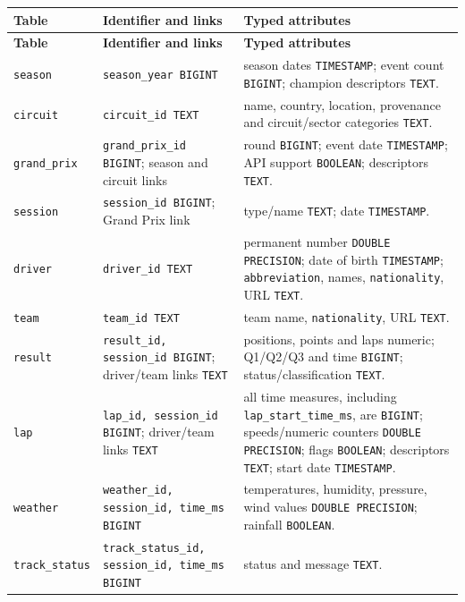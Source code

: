 \documentclass[a4paper,11pt]{article}
\begin{document}
	\begin{longtable}{p{2.5cm}p{4.3cm}p{8.2cm}}
		\toprule
		\textbf{Table} & \textbf{Identifier and links} & \textbf{Typed attributes} \\
		\midrule
		\endfirsthead
		\toprule
		\textbf{Table} & \textbf{Identifier and links} & \textbf{Typed attributes} \\
		\midrule
		\endhead
		\texttt{season} & \texttt{season\_year BIGINT} & season dates \texttt{TIMESTAMP}; event count \texttt{BIGINT}; champion descriptors \texttt{TEXT}. \\
		\midrule
		\texttt{circuit} & \texttt{circuit\_id TEXT} & name, country, location, provenance and circuit/sector categories \texttt{TEXT}. \\
		\midrule
		\texttt{grand\_prix} & \texttt{grand\_prix\_id BIGINT}; season and circuit links & round \texttt{BIGINT}; event date \texttt{TIMESTAMP}; API support \texttt{BOOLEAN}; descriptors \texttt{TEXT}. \\
		\midrule
		\texttt{session} & \texttt{session\_id BIGINT}; Grand Prix link & type/name \texttt{TEXT}; date \texttt{TIMESTAMP}. \\
		\midrule
		\texttt{driver} & \texttt{driver\_id TEXT} & permanent number \texttt{DOUBLE PRECISION}; date of birth \texttt{TIMESTAMP}; \texttt{abbreviation}, names, \texttt{nationality}, URL \texttt{TEXT}. \\
		\midrule
		\texttt{team} & \texttt{team\_id TEXT} & team name, \texttt{nationality}, URL \texttt{TEXT}. \\
		\midrule
		\texttt{result} & \texttt{result\_id, session\_id BIGINT}; driver/team links \texttt{TEXT} & positions, points and laps numeric; Q1/Q2/Q3 and time \texttt{BIGINT}; status/classification \texttt{TEXT}. \\
		\midrule
		\texttt{lap} & \texttt{lap\_id, session\_id BIGINT}; driver/team links \texttt{TEXT} & all time measures, including \texttt{lap\_start\_time\_ms}, are \texttt{BIGINT}; speeds/numeric counters \texttt{DOUBLE PRECISION}; flags \texttt{BOOLEAN}; descriptors \texttt{TEXT}; start date \texttt{TIMESTAMP}. \\
		\midrule
		\texttt{weather} & \texttt{weather\_id, session\_id, time\_ms BIGINT} & temperatures, humidity, pressure, wind values \texttt{DOUBLE PRECISION}; rainfall \texttt{BOOLEAN}. \\
		\midrule
		\texttt{track\_status} & \texttt{track\_status\_id, session\_id, time\_ms BIGINT} & status and message \texttt{TEXT}. \\
		\bottomrule
	\end{longtable}
\end{document}
